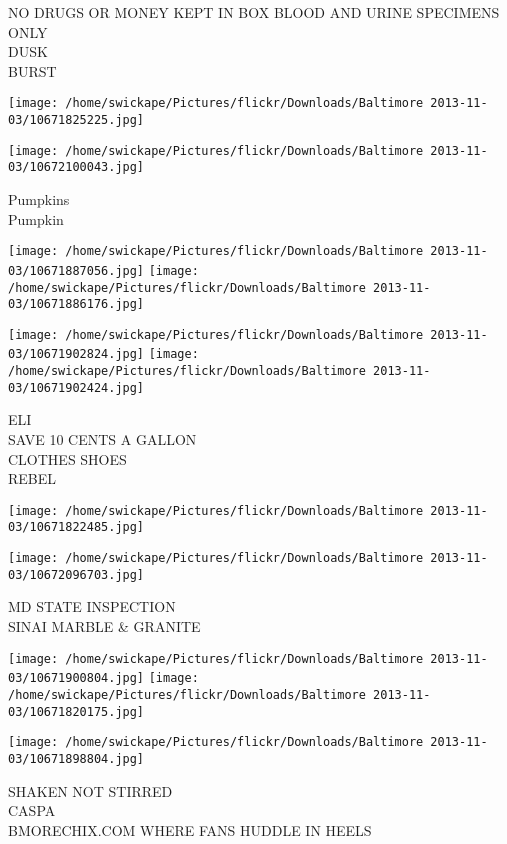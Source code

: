\documentclass[10pt,letterpaper]{article}
\begin{document}
NO DRUGS OR MONEY KEPT IN BOX BLOOD AND URINE SPECIMENS ONLY\\
DUSK\\
BURST\\
\pagebreak

\texttt{[image: /home/swickape/Pictures/flickr/Downloads/Baltimore 2013-11-03/10671825225.jpg]}

\vspace{0.25in}
\texttt{[image: /home/swickape/Pictures/flickr/Downloads/Baltimore 2013-11-03/10672100043.jpg]}

Pumpkins\\
Pumpkin\\
\pagebreak

\texttt{[image: /home/swickape/Pictures/flickr/Downloads/Baltimore 2013-11-03/10671887056.jpg]}
\texttt{[image: /home/swickape/Pictures/flickr/Downloads/Baltimore 2013-11-03/10671886176.jpg]}

\texttt{[image: /home/swickape/Pictures/flickr/Downloads/Baltimore 2013-11-03/10671902824.jpg]}
\texttt{[image: /home/swickape/Pictures/flickr/Downloads/Baltimore 2013-11-03/10671902424.jpg]}

ELI\\
SAVE 10 CENTS A GALLON\\
CLOTHES SHOES\\
REBEL\\
\pagebreak

\texttt{[image: /home/swickape/Pictures/flickr/Downloads/Baltimore 2013-11-03/10671822485.jpg]}

\vspace{0.25in}
\texttt{[image: /home/swickape/Pictures/flickr/Downloads/Baltimore 2013-11-03/10672096703.jpg]}

MD STATE INSPECTION\\
SINAI MARBLE \& GRANITE\\
\pagebreak

\texttt{[image: /home/swickape/Pictures/flickr/Downloads/Baltimore 2013-11-03/10671900804.jpg]}
\texttt{[image: /home/swickape/Pictures/flickr/Downloads/Baltimore 2013-11-03/10671820175.jpg]}

\texttt{[image: /home/swickape/Pictures/flickr/Downloads/Baltimore 2013-11-03/10671898804.jpg]}

SHAKEN NOT STIRRED\\
CASPA\\
BMORECHIX.COM WHERE FANS HUDDLE IN HEELS\\
\pagebreak
\end{document}
